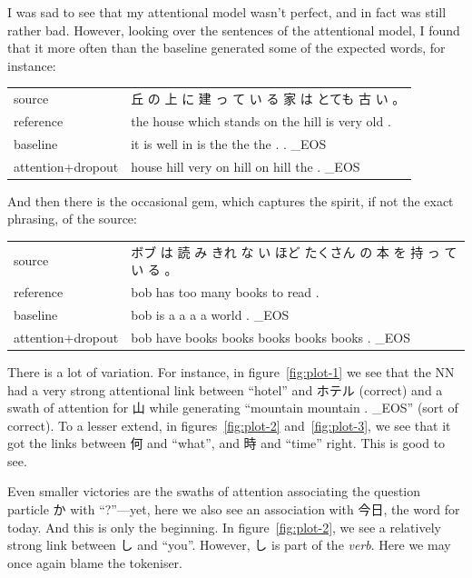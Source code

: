 \documentclass[answers]{exam}
\begin{document}
\begin{CJK}{UTF8}{min}
\begin{questions}
\begin{framed}
  I was sad to see that my attentional model wasn't perfect, and in fact was
  still rather bad. However, looking over the sentences of the attentional
  model, I found that it more often than the baseline generated some of the
  expected words, for instance:

  \begin{tabular}{ll}
    source            & 丘 の 上 に 建 っ て い る 家 は とても 古 い 。\\
    reference         & the house which stands on the hill is very old .\\
    baseline          & it is well in is the the the . . \_EOS\\
    attention+dropout & house hill very on hill on hill the . \_EOS
  \end{tabular}

  And then there is the occasional gem, which captures the spirit, if not the
  exact phrasing, of the source:

  \begin{tabular}{ll}
    source            & ボブ は 読 み きれ な い ほど たくさん の 本 を 持 っ て い る 。\\
    reference         & bob has too many books to read . \\
    baseline          & bob is a a a a world . \_EOS\\
    attention+dropout & bob have books books books books books . \_EOS
  \end{tabular}
\end{framed}

\begin{framed}
  There is a lot of variation.
  For instance, in figure~\ref{fig:plot-1} we see that the NN had a very strong
  attentional link between ``hotel'' and ホテル (correct) and a swath of attention
  for 山 while generating ``mountain mountain . \_EOS'' (sort of correct).
  To a lesser extend, in figures~\ref{fig:plot-2} and~\ref{fig:plot-3}, we see
  that it got the links between 何 and ``what'', and 時 and ``time'' right.
  This is good to see.

  Even smaller victories are the swaths of attention associating the question
  particle か with ``?''---yet, here we also see an association with 今日, the
  word for today. 
  And this is only the beginning. In figure~\ref{fig:plot-2}, we see a relatively
  strong link between し and ``you''. However, し is part of the \emph{verb}.
  Here we may once again blame the tokeniser.


\end{framed}
\end{questions}
\end{CJK}
\end{document}
